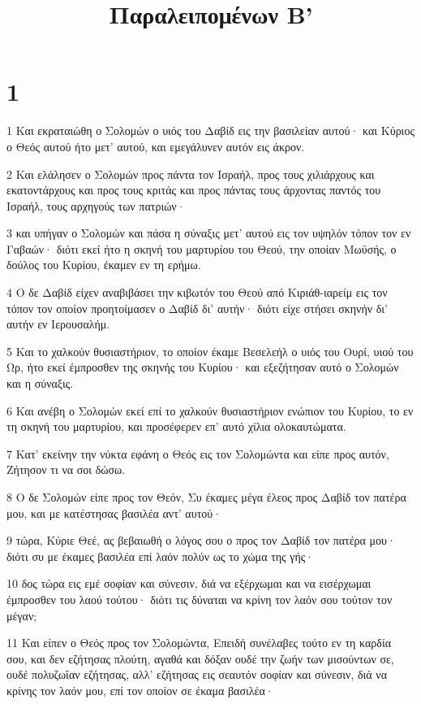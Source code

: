 

\title{Παραλειπομένων Β'}


\chapter{1}

\par 1 Και εκραταιώθη ο Σολομών ο υιός του Δαβίδ εις την βασιλείαν αυτού· και Κύριος ο Θεός αυτού ήτο μετ' αυτού, και εμεγάλυνεν αυτόν εις άκρον.
\par 2 Και ελάλησεν ο Σολομών προς πάντα τον Ισραήλ, προς τους χιλιάρχους και εκατοντάρχους και προς τους κριτάς και προς πάντας τους άρχοντας παντός του Ισραήλ, τους αρχηγούς των πατριών·
\par 3 και υπήγαν ο Σολομών και πάσα η σύναξις μετ' αυτού εις τον υψηλόν τόπον τον εν Γαβαών· διότι εκεί ήτο η σκηνή του μαρτυρίου του Θεού, την οποίαν Μωϋσής, ο δούλος του Κυρίου, έκαμεν εν τη ερήμω.
\par 4 Ο δε Δαβίδ είχεν αναβιβάσει την κιβωτόν του Θεού από Κιριάθ-ιαρείμ εις τον τόπον τον οποίον προητοίμασεν ο Δαβίδ δι' αυτήν· διότι είχε στήσει σκηνήν δι' αυτήν εν Ιερουσαλήμ.
\par 5 Και το χαλκούν θυσιαστήριον, το οποίον έκαμε Βεσελεήλ ο υιός του Ουρί, υιού του Ωρ, ήτο εκεί έμπροσθεν της σκηνής του Κυρίου· και εξεζήτησαν αυτό ο Σολομών και η σύναξις.
\par 6 Και ανέβη ο Σολομών εκεί επί το χαλκούν θυσιαστήριον ενώπιον του Κυρίου, το εν τη σκηνή του μαρτυρίου, και προσέφερεν επ' αυτό χίλια ολοκαυτώματα.
\par 7 Κατ' εκείνην την νύκτα εφάνη ο Θεός εις τον Σολομώντα και είπε προς αυτόν, Ζήτησον τι να σοι δώσω.
\par 8 Ο δε Σολομών είπε προς τον Θεόν, Συ έκαμες μέγα έλεος προς Δαβίδ τον πατέρα μου, και με κατέστησας βασιλέα αντ' αυτού·
\par 9 τώρα, Κύριε Θεέ, ας βεβαιωθή ο λόγος σου ο προς τον Δαβίδ τον πατέρα μου· διότι συ με έκαμες βασιλέα επί λαόν πολύν ως το χώμα της γής·
\par 10 δος τώρα εις εμέ σοφίαν και σύνεσιν, διά να εξέρχωμαι και να εισέρχωμαι έμπροσθεν του λαού τούτου· διότι τις δύναται να κρίνη τον λαόν σου τούτον τον μέγαν;
\par 11 Και είπεν ο Θεός προς τον Σολομώντα, Επειδή συνέλαβες τούτο εν τη καρδία σου, και δεν εζήτησας πλούτη, αγαθά και δόξαν ουδέ την ζωήν των μισούντων σε, ουδέ πολυζωΐαν εζήτησας, αλλ' εζήτησας εις σεαυτόν σοφίαν και σύνεσιν, διά να κρίνης τον λαόν μου, επί τον οποίον σε έκαμα βασιλέα·
